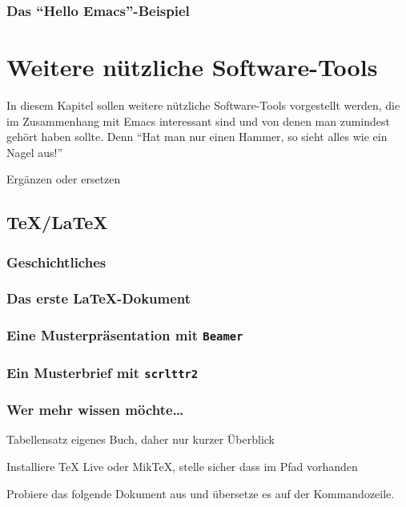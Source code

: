 \documentclass[12pt,ngerman]{scrbook}
\begin{document}
\subsection{Das \enquote{Hello Emacs}-Beispiel}




\chapter{Weitere nützliche Software-Tools}

In diesem Kapitel sollen weitere nützliche Software-Tools vorgestellt werden, die im Zusammenhang mit Emacs interessant sind und von denen man zumindest gehört haben sollte. Denn \enquote{Hat man nur einen Hammer, so sieht alles wie ein Nagel aus!}	

Ergänzen oder ersetzen

\section{\TeX/\LaTeX}

\subsection{Geschichtliches}



\subsection{Das erste \LaTeX-Dokument}


\subsection{Eine Musterpräsentation mit \texttt{Beamer}}


\subsection{Ein Musterbrief mit \texttt{scrlttr2}}


\subsection{Wer mehr wissen möchte\ldots}


Tabellensatz eigenes Buch, daher nur kurzer Überblick

Installiere TeX Live oder MikTeX, stelle sicher dass im Pfad vorhanden

Probiere das folgende Dokument aus und übersetze es auf der Kommandozeile.
\end{document}
